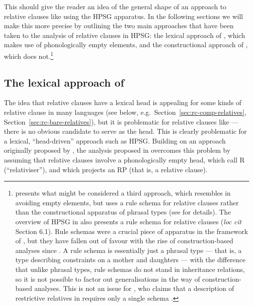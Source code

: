 \documentclass[output=paper,nonflat,draftmode]{./langsci/langscibook}
\begin{document}
This should give the reader an idea of the general shape of an approach to relative
clauses like  using the HPSG apparatus. In the following sections we will make this
more precise by outlining the two main approaches that have been taken to the analysis of
relative clauses in HPSG: the lexical approach of \cite[Chapter~5]{Pollard:Sag:94}, which
makes use of phonologically empty elements, and the constructional approach of
\cite{Sag:97}, which does not.\footnote{\cite{Mueller99b} presents what might be
  considered a third approach, which resembles \cite{Sag:97} in avoiding empty elements,
  but uses a rule schema for  relative clauses rather than the constructional apparatus
  of phrasal types (see \citealt[95]{Mueller99b} for details). The overview of HPSG in
  \cite{MuellerCurrentApproaches} also presents a rule schema for relative clauses
  (\emph{loc cit} Section 6.1). Rule schemas were a crucial piece of apparatus in the framework of
  \cite{Pollard:Sag:94}, but they have fallen out of favour with the rise of construction-based 
  analyses since \cite{Sag:97}. A rule schema is essentially just a phrasal type ---
  that is, a type describing constraints on a mother and daughters --- with the difference
  that unlike phrasal types, rule schemas do not stand in inheritance relations, so it is
  not possible to factor out generalisations in the way of construction-based
  analyses. This is not an issue for \citeauthor{Mueller99b}, who claims that a
  description of restrictive relatives in  requires only a single schema
  \citep[74]{Mueller99b}.}

\subsection{The lexical approach of }
\label{sec:rc-pollard--sag}

The idea that relative clauses have a lexical head is appealing for some kinds of relative
clause in many languages (see below, e.g.\ Section~\ref{sec:rc-comp-relatives},
Section~\ref{sec:rc-bare-relatives}), but it is problematic for relative clauses like
 --- there is no obvious candidate to serve as the head.  This is clearly
problematic for a lexical, ``head-driven'' approach such as HPSG. Building on an approach originally
proposed by \cite{borsley1989phrase}, the analysis proposed in
\cite[Chapter~5]{Pollard:Sag:94} overcomes this problem by assuming that relative clauses
involve a phonologically empty head, which \citeauthor{Pollard:Sag:94} call R
(``relativiser''), and which projects an RP (that is, a relative clause).
\end{document}
